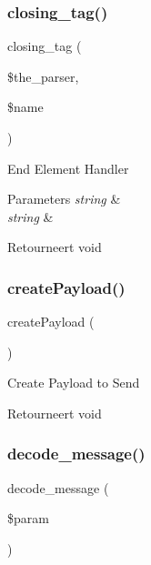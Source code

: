 \subsubsection{\texorpdfstring{closing\_tag()}{closing\_tag()}}
{\footnotesize\ttfamily closing\+\_\+tag (\begin{DoxyParamCaption}\item[{}]{\$the\+\_\+parser,  }\item[{}]{\$name }\end{DoxyParamCaption})}

End Element Handler


\begin{DoxyParams}{Parameters}
{\em string} & \\
\hline
{\em string} & \\
\hline
\end{DoxyParams}
\begin{DoxyReturn}{Retourneert}
void 
\end{DoxyReturn}
\mbox{\label{class_x_m_l___r_p_c___message_a9db0a53d149ebbb907ef60a27bbc9f1c}} 
\subsubsection{\texorpdfstring{createPayload()}{createPayload()}}
{\footnotesize\ttfamily create\+Payload (\begin{DoxyParamCaption}{ }\end{DoxyParamCaption})}

Create Payload to Send

\begin{DoxyReturn}{Retourneert}
void 
\end{DoxyReturn}
\mbox{\label{class_x_m_l___r_p_c___message_a76c958448d4b6569bfab9bfd2fb3dff0}} 
\subsubsection{\texorpdfstring{decode\_message()}{decode\_message()}}
{\footnotesize\ttfamily decode\+\_\+message (\begin{DoxyParamCaption}\item[{}]{\$param }\end{DoxyParamCaption})}

